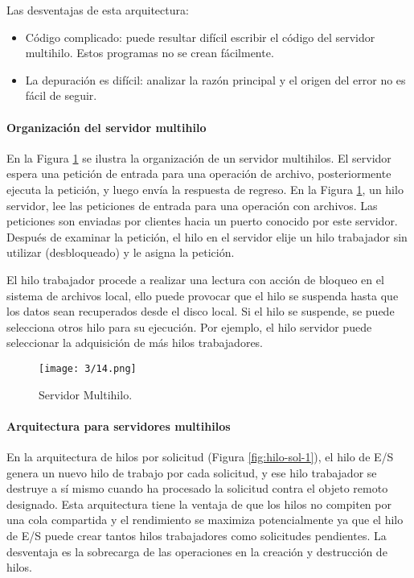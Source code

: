 	
		
	Las desventajas de esta arquitectura:
	\begin{itemize}
		\item Código complicado: puede resultar difícil escribir el código del servidor multihilo. Estos programas no se  crean fácilmente.
		\item La depuración es difícil: analizar la razón principal
			 y el origen del error no es fácil de seguir.
	\end{itemize}
 
 
 
	\paragraph{Organización del servidor multihilo }
	
 
En la Figura \ref{fig:serv-multi} se ilustra la  organización de un servidor multihilos. El servidor  espera una petición de entrada para una operación de  archivo, posteriormente ejecuta la petición, y luego envía la respuesta de regreso. En la Figura \ref{fig:serv-multi}, un hilo servidor, lee las peticiones  de entrada para una operación con archivos. Las peticiones son enviadas por clientes hacia  un puerto   conocido por este servidor. Después de examinar la petición, el hilo en el servidor elije  un hilo trabajador sin utilizar (desbloqueado) y le asigna la petición.
 
 El hilo trabajador procede a realizar una lectura con acción de bloqueo en el sistema de archivos local, ello puede  provocar que el hilo se suspenda hasta que los datos sean recuperados desde el disco local. Si el hilo  se suspende, se puede selecciona otros hilo para su ejecución. Por ejemplo, el hilo servidor puede seleccionar la adquisición de más hilos trabajadores. 
 
 
	
	  \begin{figure}    
	  	\begin{center} %
		\texttt{[image: 3/14.png]}
		\caption{Servidor Multihilo. }
		\label{fig:serv-multi}
	 \end{center} 
 \end{figure} 

 
 \paragraph*{Arquitectura para servidores multihilos}
 En la arquitectura de hilos por solicitud (Figura \ref{fig:hilo-sol-1}), el hilo de E/S genera un nuevo hilo de trabajo por cada solicitud, y ese hilo trabajador se destruye a sí mismo cuando ha procesado la  solicitud contra el objeto remoto designado. Esta arquitectura tiene la ventaja de que  los hilos no compiten por una cola compartida y el rendimiento se maximiza potencialmente  ya que el hilo de E/S puede crear tantos hilos trabajadores como solicitudes pendientes.  La desventaja es la sobrecarga de las operaciones en la creación y destrucción de hilos.
 		 
